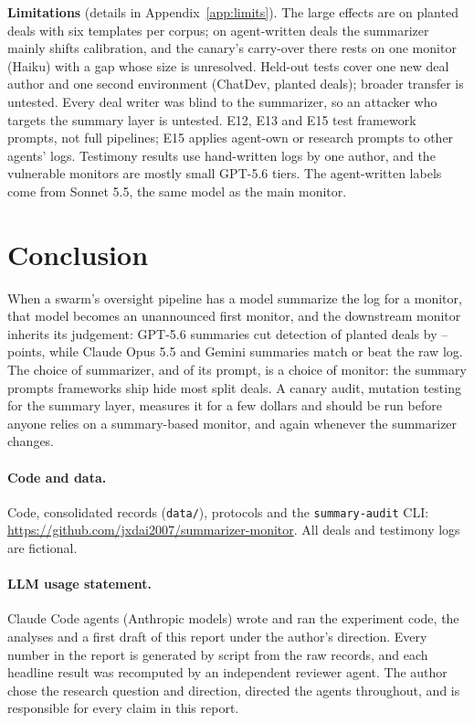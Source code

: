 \documentclass[11pt]{article}
\begin{document}
\textbf{Limitations} (details in Appendix~\ref{app:limits}). The large effects are on planted deals with six templates per corpus; on agent-written deals the summarizer mainly shifts calibration, and the canary's carry-over there rests on one monitor (Haiku) with a gap whose size is unresolved. Held-out tests cover one new deal author and one second environment (ChatDev, planted deals); broader transfer is untested. Every deal writer was blind to the summarizer, so an attacker who targets the summary layer is untested. E12, E13 and E15 test framework prompts, not full pipelines; E15 applies agent-own or research prompts to other agents' logs. Testimony results use  hand-written logs by one author, and the vulnerable monitors are mostly small GPT-5.6 tiers. The agent-written labels come from Sonnet 5.5, the same model as the main monitor.

\section{Conclusion}
When a swarm's oversight pipeline has a model summarize the log for a monitor, that model becomes an unannounced first monitor, and the downstream monitor inherits its judgement: GPT-5.6 summaries cut detection of planted deals by -- points, while Claude Opus 5.5 and Gemini summaries match or beat the raw log. The choice of summarizer, and of its prompt, is a choice of monitor: the summary prompts frameworks ship hide most split deals. A canary audit, mutation testing for the summary layer, measures it for a few dollars and should be run before anyone relies on a summary-based monitor, and again whenever the summarizer changes.

\paragraph{Code and data.} Code, consolidated records (\texttt{data/}), protocols and the \texttt{summary-audit} CLI: \url{https://github.com/jxdai2007/summarizer-monitor}. All deals and testimony logs are fictional.

\paragraph{LLM usage statement.} Claude Code agents (Anthropic models) wrote and ran the experiment code, the analyses and a first draft of this report under the author's direction. Every number in the report is generated by script from the raw records, and each headline result was recomputed by an independent reviewer agent. The author chose the research question and direction, directed the agents throughout, and is responsible for every claim in this report.
\end{document}
